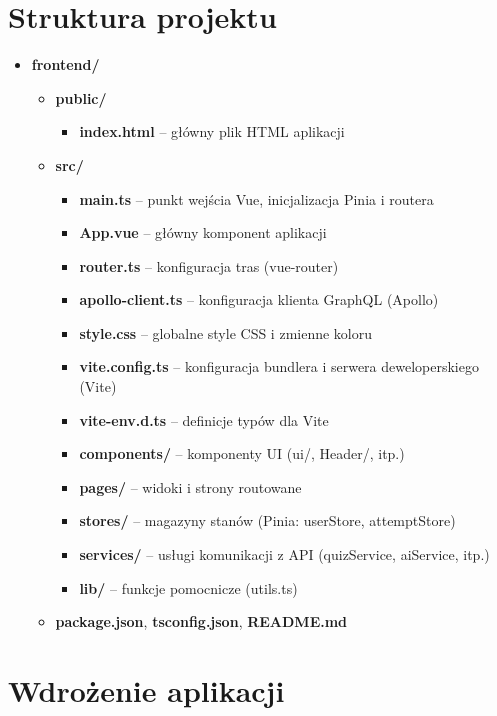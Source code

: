 \documentclass{article}
\begin{document}
    \section{Struktura projektu}
    \begin{itemize}
      \item \textbf{frontend/}
      \begin{itemize}
        \item \textbf{public/}
        \begin{itemize}
          \item \textbf{index.html} – główny plik HTML aplikacji
        \end{itemize}
        \item \textbf{src/}
        \begin{itemize}
          \item \textbf{main.ts} – punkt wejścia Vue, inicjalizacja Pinia i routera
          \item \textbf{App.vue} – główny komponent aplikacji
          \item \textbf{router.ts} – konfiguracja tras (vue-router)
          \item \textbf{apollo-client.ts} – konfiguracja klienta GraphQL (Apollo)
          \item \textbf{style.css} – globalne style CSS i zmienne koloru
          \item \textbf{vite.config.ts} – konfiguracja bundlera i serwera deweloperskiego (Vite)
          \item \textbf{vite-env.d.ts} – definicje typów dla Vite
          \item \textbf{components/} – komponenty UI (ui/, Header/, itp.)
          \item \textbf{pages/} – widoki i strony routowane
          \item \textbf{stores/} – magazyny stanów (Pinia: userStore, attemptStore)
          \item \textbf{services/} – usługi komunikacji z API (quizService, aiService, itp.)
          \item \textbf{lib/} – funkcje pomocnicze (utils.ts)
        \end{itemize}
        \item \textbf{package.json}, \textbf{tsconfig.json}, \textbf{README.md}
      \end{itemize}
    \end{itemize}

    \section{Wdrożenie aplikacji}
\end{document}

